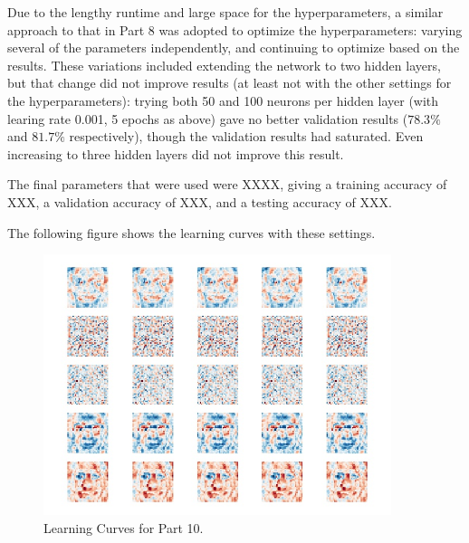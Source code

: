 \documentclass{article}
\begin{document}
   Due to the lengthy runtime and large space for the hyperparameters, a similar approach
   to that in Part 8 was adopted to optimize the hyperparameters: varying several of the parameters
   independently, and continuing to optimize based on the results.
   These variations included extending the network to two hidden layers, but that change did not
   improve results (at least not with the other settings for the hyperparameters):
   trying both 50 and 100 neurons per hidden layer (with learing rate 0.001, 5 epochs as above)
   gave no better validation results ($78.3\%$ and $81.7\%$ respectively), though the validation
   results had saturated. Even increasing to three hidden layers did not improve this result.

   The final parameters that were used were XXXX, giving a training accuracy of XXX, a validation
   accuracy of XXX, and a testing accuracy of XXX.

   The following figure shows the learning curves with these settings.

      \begin{figure}[h!] \centering
         \includegraphics[width=4in]{resources/part9}
         \caption{Learning Curves for Part 10.}
         \label{part10}
       \end{figure}
\end{document}
